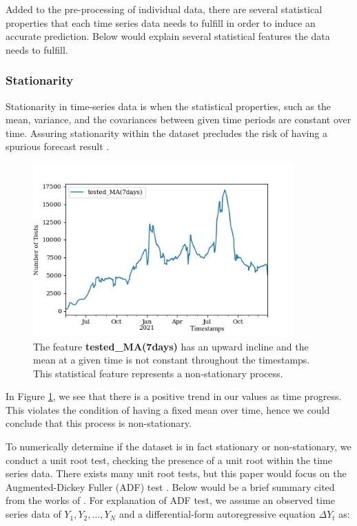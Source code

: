 Added to the pre-processing of individual data, there are several statistical properties that each time series data needs to fulfill in order to induce an accurate prediction. Below would explain several statistical features the data needs to fulfill. 

\subsubsection{Stationarity}
Stationarity in time-series data is when the statistical properties, such as the mean, variance, and the covariances between given time periods are constant over time. Assuring stationarity within the dataset precludes the risk of having a spurious forecast result \citep{granger_spurious_1974}.

\begin{figure}[!ht]
    \centering
    \includegraphics[width=10cm]{images/Non_stationary.png}
    \caption{The feature \textbf{tested\_MA(7days)} has an upward incline and the mean at a given time is not constant throughout the timestamps. This statistical feature represents a non-stationary process.}
    \label{fig:non-stationary}
\end{figure}

In Figure \ref{fig:non-stationary}, we see that there is a positive trend in our values as time progress. This violates the condition of having a fixed mean over time, hence we could conclude that this process is non-stationary. 

To numerically determine if the dataset is in fact stationary or non-stationary, we conduct a unit root test, checking the presence of a unit root within the time series data. There exists many unit root tests, but this paper would focus on the Augmented-Dickey Fuller (ADF) test \citep{ADF}. Below would be a brief summary cited from the works of \citet{ADF, ADF_test_statistic}. For explanation of ADF test, we assume an observed time series data of $Y_{1}, Y_{2},\ldots, Y_{N}$ and a differential-form autoregressive equation $\Delta Y_{t}$ as:

